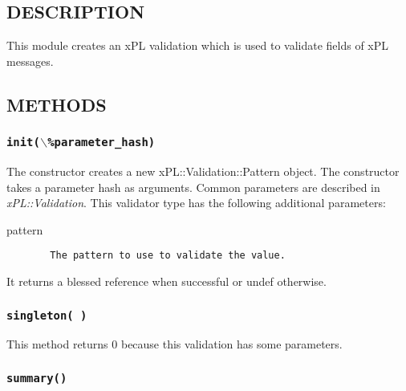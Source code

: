 \documentclass[12pt,a4paper]{article}
\begin{document}
\subsection*{DESCRIPTION\label{xPL::Validation::Pattern_DESCRIPTION}}


This module creates an xPL validation which is used to validate fields
of xPL messages.

\subsection*{METHODS\label{xPL::Validation::Pattern_METHODS}}
\subsubsection*{\texttt{init($\backslash$\%parameter\_hash)}\label{xPL::Validation::Pattern_init_backslash_parameter_hash_}}


The constructor creates a new xPL::Validation::Pattern object.
The constructor takes a parameter hash as arguments.  Common
parameters are described in \emph{xPL::Validation}.  This validator type
has the following additional parameters:

\begin{description}

\item[{pattern}] \mbox{}\begin{verbatim}
  The pattern to use to validate the value.
\end{verbatim}
\end{description}


It returns a blessed reference when successful or undef otherwise.

\subsubsection*{\texttt{singleton( )}\label{xPL::Validation::Pattern_singleton_}}


This method returns 0 because this validation has some parameters.

\subsubsection*{\texttt{summary()}\label{xPL::Validation::Pattern_summary_}}
\end{document}
